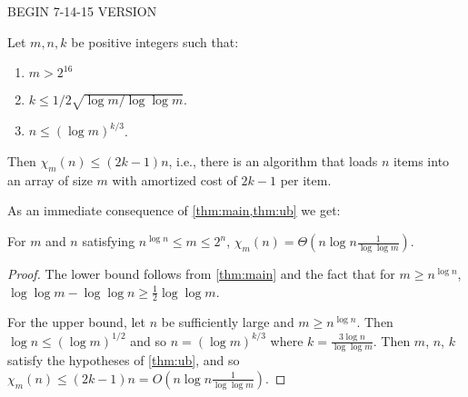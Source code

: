 \documentclass[unicode,review]{siamart1116}
\numberwithin{theorem}{section}
\begin{document}
\iffalse
BEGIN 7-14-15 VERSION
\begin{theorem}
\label{thm:ub}
Let $m,n,k$ be positive integers such that:
\begin{enumerate}
\item $m>2^{16}$
\item $k\leq 1/2\sqrt{\log m/\log \log m}$.  
\item  $n \leq (\log m)^{k/3}$.
\end{enumerate}
Then $\chi_m(n) \leq (2k-1)n$, i.e., there is an algorithm that loads $n$ items into an array of size $m$ with amortized cost of $2k-1$ per item. 
\end{theorem}                  

As an immediate consequence of \cref{thm:main,thm:ub} we get:

\begin{corollary}
For $m$ and $n$ satisfying $n^{\log n}\leq m \leq 2^n$, $\chi_m(n) = \Theta(n \log n \frac{1}{\log\log m})$.
\end{corollary}

\begin{proof}
The lower bound follows from \cref{thm:main} and the fact that for $m \geq n^{\log n}$, $\log\log m - \log\log n \geq \frac{1}{2} \log\log m$.

For the upper bound, let
$n$ be sufficiently large and $m \geq n^{\log n}$.  Then $\log n \leq (\log m)^{1/2}$ and so $n = (\log m)^{k/3}$ where $k =\frac{3\log n}{\log\log m} $.
Then $m$, $n$, $k$ satisfy the hypotheses of \cref{thm:ub}, and so $\chi_m(n) \leq (2k-1) n = O(n \log n \frac{1}{\log\log m})$. 
\end{proof}
\end{document}
